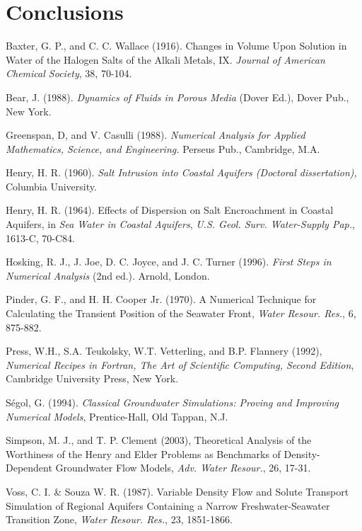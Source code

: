 \documentclass{article}
\begin{document}
\section{Conclusions}

  
  
\begin{thebibliography}{30}
    Baxter, G. P., and C. C. Wallace (1916). Changes in Volume 
    Upon Solution in Water of the Halogen Salts of the Alkali Metals, IX. 
     \textit{Journal of American Chemical Society}, 38, 70-104.

    Bear, J. (1988). \textit{Dynamics of Fluids in Porous Media} 
    (Dover Ed.), Dover Pub., New York.

    Greenspan, D, and V. Casulli (1988). \textit{Numerical 
    Analysis for Applied Mathematics, Science, and Engineering.} Perseus Pub., 
    Cambridge, M.A.

    Henry, H. R. (1960). \textit{Salt Intrusion into Coastal 
    Aquifers (Doctoral dissertation),} Columbia University.

    Henry, H. R. (1964). Effects of Dispersion on Salt 
    Encroachment in Coastal Aquifers, in \textit{Sea Water in Coastal Aquifers},
     \textit{U.S. Geol. Surv. Water-Supply Pap.}, 1613-C, 70-C84.

    Hosking, R. J., J. Joe, D. C. Joyce, and J. C. Turner 
    (1996). \textit{First Steps in Numerical Analysis} (2nd ed.).
    Arnold, London. 

    Pinder, G. F., and H. H. Cooper Jr. (1970). A Numerical 
    Technique for Calculating the Transient Position of the Seawater Front, 
     \textit{Water Resour. Res.}, 6, 875-882.

    Press, W.H., S.A. Teukolsky, W.T. Vetterling, and B.P. Flannery 
    (1992), \textit{Numerical Recipes in Fortran, The Art of Scientific Computing, 
    Second Edition}, Cambridge University Press, New York.

    S\'egol, G. (1994). \textit{Classical Groundwater Simulations: 
    Proving and Improving Numerical Models}, Prentice-Hall, Old Tappan, N.J. 

    Simpson, M. J., and T. P. Clement (2003), 
    Theoretical Analysis of the Worthiness of the Henry and Elder Problems as 
    Benchmarks of Density-Dependent Groundwater Flow Models, \textit{Adv. Water 
    Resour.}, 26, 17-31.

    Voss, C. I. \& Souza W. R. (1987). Variable Density Flow and 
    Solute Transport Simulation of Regional Aquifers Containing a Narrow 
    Freshwater-Seawater Transition Zone, \textit{Water Resour. Res.}, 23, 
    1851-1866.
\end{thebibliography}
\end{document}
